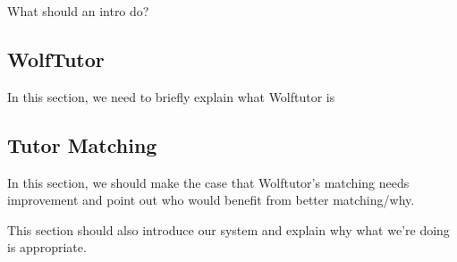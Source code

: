 What should an intro do?

\subsection{WolfTutor}
\label{sec:wolftutor}

In this section, we need to briefly explain what Wolftutor is

\subsection{Tutor Matching}
\label{sec:tutor-matching}

In this section, we should make the case that Wolftutor's matching needs
improvement and point out who would benefit from better matching/why.

This section should also introduce our system and explain why what we're doing
is appropriate.
